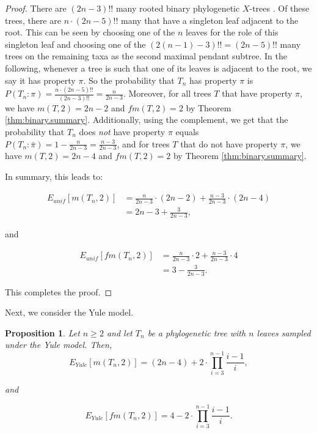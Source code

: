 \documentclass{amsart}
\newtheorem{proposition}[theorem]{Proposition}
\theoremstyle{definition}
\begin{document}
\begin{proof}
There are $(2n-3)!!$ many rooted binary phylogenetic $X$-trees \cite{Semple2003}. Of these trees, there are $n\cdot (2n-5)!!$ many that have a singleton leaf adjacent to the root. This can be seen by choosing one of the $n$ leaves for the role of this singleton leaf and choosing one of the  $(2(n-1)-3)!!=(2n-5)!!$ many trees on the remaining taxa as the second maximal pendant subtree. In the following, whenever a tree is such that one of its leaves is adjacent to the root, we say it has property $\pi$. So the probability that $T_n$ has property $\pi$ is $P(T_n:\pi) = \frac{n\cdot (2n-5)!!}{(2n-3)!!}=\frac{n}{2n-3} $.
Moreover, for all trees $T$ that have property $\pi$, we have $m(T,2)=2n-2$ and $fm(T,2)=2$ by Theorem \ref{thm:binary.summary}. 
Additionally, using the complement, we get that the probability that $T_n$ does \emph{not} have property $\pi$ equals $P(T_n: \bar{\pi})=1- \frac{n}{2n-3} = \frac{n-3}{2n-3}$, and for trees $T$ that do not have property $\pi$, we have $m(T,2)=2n-4$ and $fm(T,2)=2$ by Theorem \ref{thm:binary.summary}.

In summary, this leads to:

\begin{align*}
  E_{unif}[m(T_n,2)]&=  \frac{n}{2n-3} \cdot (2n-2) +  \frac{n-3}{2n-3} \cdot (2n-4)\\
  &= 2n-3+\frac{3}{2n-3},
\end{align*}

and

\begin{align*}
  E_{unif}[fm(T_n,2)]&=  \frac{n}{2n-3} \cdot 2 +  \frac{n-3}{2n-3} \cdot 4\\
  &= 3 - \frac{3}{2n-3}.
\end{align*}

This completes the proof. 

\end{proof}

Next, we consider the Yule model.

\begin{proposition}\label{cor_binaryYule} 
Let $n \geq 2$ and let $T_n$ be a phylogenetic tree with $n$ leaves sampled under the Yule model. Then,
$$E_{Yule}[m(T_n,2)]=(2n-4)+2\cdot  \prod\limits_{i=3}^{n-1}\frac{i-1}{i},$$

and 

$$E_{Yule}[fm(T_n,2)]=4-2\cdot  \prod\limits_{i=3}^{n-1}\frac{i-1}{i}.$$
\end{proposition}
\end{document}
